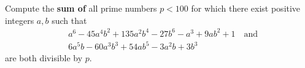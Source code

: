 Compute the \textbf{sum of} all prime numbers $p<100$ for which there exist positive integers $a,b$ such that
\begin{align*}
	& a^6-45a^4b^2+135a^2b^4-27b^6-a^3+9ab^2+1 \quad \text{and}\\
	& 6a^5b-60a^3b^3+54ab^5-3a^2b+3b^3
\end{align*}
are both divisible by $p$.
